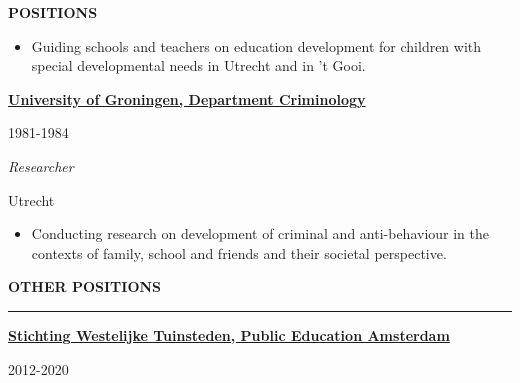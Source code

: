 \documentclass[
  16,
]{article}
\providecommand{\tightlist}{%
  \setlength{\itemsep}{0pt}\setlength{\parskip}{0pt}}\usepackage{longtable,booktabs,array}
\begin{document}
\begin{large}{\bf POSITIONS}
\begin{itemize}
\tightlist
\item
  Guiding schools and teachers on education development for children
  with special developmental needs in Utrecht and in 't Gooi.
\end{itemize}

\vspace{7pt}

\begin{large}
  \begin{multicols}{2}
    \begin{flushleft}{\bf \href{https://www.rug.nl/rechten/organisatie/vakgroepen/straf-cri/onderwijs}{University of Groningen, Department Criminology}}\end{flushleft}
    \begin{flushright}1981-1984\end{flushright}
  \end{multicols}
  \vspace{-0.17cm}
  \begin{multicols}{2}
    \begin{flushleft}\textit{Researcher}\end{flushleft}
    \begin{flushright}Utrecht\end{flushright}\end
  {multicols}
\end{large}
\vspace{-0.16cm}

\begin{itemize}
\tightlist
\item
  Conducting research on development of criminal and anti-behaviour in
  the contexts of family, school and friends and their societal
  perspective.
\end{itemize}

\vspace{7pt}

\begin{large}{\bf OTHER POSITIONS}
  \vspace{3pt}
  \hrule

  \begin{multicols}{2}
    \begin{flushleft}{\bf \href{https://stwt.nl/}{Stichting Westelijke Tuinsteden, Public Education Amsterdam}}\end{flushleft}
    \begin{flushright}2012-2020\end{flushright}
  \end{multicols}
  \vspace{-0.17cm}


\end{large}
\end{large}
\end{document}
